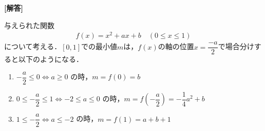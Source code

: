 \documentclass[../../main.tex]{subfiles}
\begin{document}
\begin{oframed}
  
\end{oframed}

{\bf [解答]}

与えられた関数
\begin{align}
  f(x) = x^2 + ax + b \quad (0 \le x \le 1) \label{eq:1}
\end{align}
について考える．$[0,1]$での最小値$m$は，$f(x)$の軸の位置$x=\dfrac{-a}{2}$で場合分けすると以下のようになる．

\begin{enumerate}
  \item[ア] $-\dfrac{a}{2} \le 0 \iff a \ge 0$ の時，$m = f(0) = b$
  \item[イ] $0 \le -\dfrac{a}{2} \le 1 \iff -2 \le a \le 0$ の時，$m = f\left(-\dfrac{a}{2}\right) = -\dfrac{1}{4}a^2 + b$
  \item[ウ] $1 \le -\dfrac{a}{2} \iff a \le -2$ の時，$m = f(1) = a + b + 1$
\end{enumerate}
\end{document}
